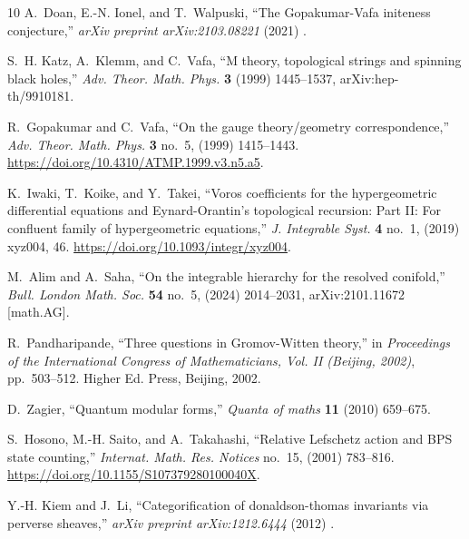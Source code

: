 \documentclass[a4paper,12pt,justification=centering]{article}
\numberwithin{equation}{section}
\providecommand{\href}[2]{#2}
\theoremstyle{plain}%
\theoremstyle{definition}
\begin{document}
\begin{thebibliography}{10}
A.~Doan, E.-N. Ionel, and T.~Walpuski, ``{The Gopakumar-Vafa initeness
  conjecture},'' {\em arXiv preprint arXiv:2103.08221} (2021) .

S.~H. Katz, A.~Klemm, and C.~Vafa, ``{M theory, topological strings and
  spinning black holes},''
  \href{http://dx.doi.org/10.4310/ATMP.1999.v3.n5.a6}{{\em Adv. Theor. Math.
  Phys.} {\bfseries 3} (1999) 1445--1537},
  \href{http://arxiv.org/abs/hep-th/9910181}{{\ttfamily arXiv:hep-th/9910181}}.

R.~Gopakumar and C.~Vafa, ``On the gauge theory/geometry correspondence,''
  \href{http://dx.doi.org/10.4310/ATMP.1999.v3.n5.a5}{{\em Adv. Theor. Math.
  Phys.} {\bfseries 3} no.~5, (1999) 1415--1443}.
  \url{https://doi.org/10.4310/ATMP.1999.v3.n5.a5}.

K.~Iwaki, T.~Koike, and Y.~Takei, ``Voros coefficients for the hypergeometric
  differential equations and {E}ynard-{O}rantin's topological recursion: {P}art
  {II}: {F}or confluent family of hypergeometric equations,''
  \href{http://dx.doi.org/10.1093/integr/xyz004}{{\em J. Integrable Syst.}
  {\bfseries 4} no.~1, (2019) xyz004, 46}.
  \url{https://doi.org/10.1093/integr/xyz004}.

M.~Alim and A.~Saha, ``{On the integrable hierarchy for the resolved
  conifold},'' \href{http://dx.doi.org/10.1112/blms.12676}{{\em Bull. London
  Math. Soc.} {\bfseries 54} no.~5, (2024) 2014--2031},
  \href{http://arxiv.org/abs/2101.11672}{{\ttfamily arXiv:2101.11672
  [math.AG]}}.

R.~Pandharipande, ``Three questions in {G}romov-{W}itten theory,'' in {\em
  Proceedings of the {I}nternational {C}ongress of {M}athematicians, {V}ol.
  {II} ({B}eijing, 2002)}, pp.~503--512.
\newblock Higher Ed. Press, Beijing, 2002.

D.~Zagier, ``Quantum modular forms,'' {\em Quanta of maths} {\bfseries 11}
  (2010) 659--675.

S.~Hosono, M.-H. Saito, and A.~Takahashi, ``Relative {L}efschetz action and
  {BPS} state counting,''
  \href{http://dx.doi.org/10.1155/S107379280100040X}{{\em Internat. Math. Res.
  Notices} no.~15, (2001) 783--816}.
  \url{https://doi.org/10.1155/S107379280100040X}.

Y.-H. Kiem and J.~Li, ``Categorification of donaldson-thomas invariants via
  perverse sheaves,'' {\em arXiv preprint arXiv:1212.6444} (2012) .


\end{thebibliography}
\end{document}
